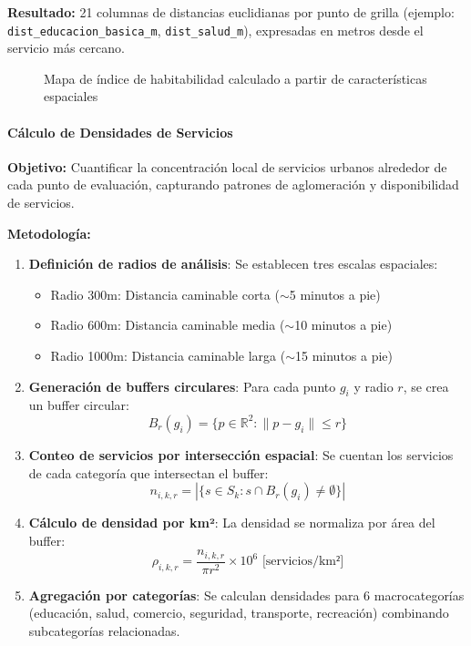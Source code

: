 \textbf{Resultado:} 21 columnas de distancias euclidianas por punto de grilla (ejemplo: \texttt{dist\_educacion\_basica\_m}, \texttt{dist\_salud\_m}), expresadas en metros desde el servicio más cercano.

\begin{figure}[H]
    \centering
    \caption{Mapa de índice de habitabilidad calculado a partir de características espaciales}
    \label{fig:mapa_habitabilidad}
\end{figure}

\paragraph{Cálculo de Densidades de Servicios}

\textbf{Objetivo:} Cuantificar la concentración local de servicios urbanos alrededor de cada punto de evaluación, capturando patrones de aglomeración y disponibilidad de servicios.

\textbf{Metodología:}
\begin{enumerate}
    \item \textbf{Definición de radios de análisis}: Se establecen tres escalas espaciales:
    \begin{itemize}
        \item Radio 300m: Distancia caminable corta ($\sim$5 minutos a pie)
        \item Radio 600m: Distancia caminable media ($\sim$10 minutos a pie)
        \item Radio 1000m: Distancia caminable larga ($\sim$15 minutos a pie)
    \end{itemize}
    
    \item \textbf{Generación de buffers circulares}: Para cada punto $g_i$ y radio $r$, se crea un buffer circular:
    \begin{equation}
    B_r(g_i) = \{p \in \mathbb{R}^2 : \|p - g_i\| \leq r\}
    \end{equation}
    
    \item \textbf{Conteo de servicios por intersección espacial}: Se cuentan los servicios de cada categoría que intersectan el buffer:
    \begin{equation}
    n_{i,k,r} = |\{s \in S_k : s \cap B_r(g_i) \neq \emptyset\}|
    \end{equation}
    
    \item \textbf{Cálculo de densidad por km²}: La densidad se normaliza por área del buffer:
    \begin{equation}
    \rho_{i,k,r} = \frac{n_{i,k,r}}{\pi r^2} \times 10^6 \text{ [servicios/km²]}
    \end{equation}
    
    \item \textbf{Agregación por categorías}: Se calculan densidades para 6 macrocategorías (educación, salud, comercio, seguridad, transporte, recreación) combinando subcategorías relacionadas.
\end{enumerate}

